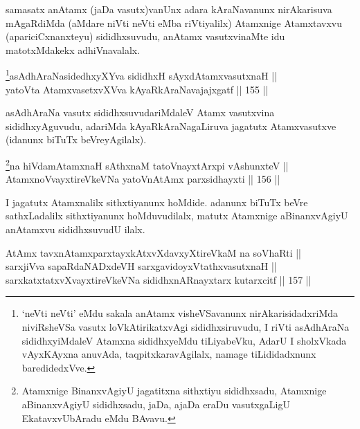 \begin{artha}
samasatx anAtamx (jaDa vasutx)vanUnx adara kAraNavanunx nirAkarisuva
mAgaRdiMda (aMdare niVti neVti eMba riVtiyalilx) Atamxnige Atamxtavxvu
(apariciCxnanxteyu) sididhxsuvudu, anAtamx vasutxvinaMte idu
matotxMdakekx adhiVnavalalx.
\end{artha}



\begin{shl}
\footnote{`neVti neVti' eMdu sakala anAtamx visheVSavanunx
nirAkarisidadxriMda niviRsheVSa vasutx loVkAtirikatxvAgi
sididhxsiruvudu, I riVti asAdhAraNa sididhxyiMdaleV Atamxna
sididhxyeMdu tiLiyabeVku, AdarU I sholxVkada vAyxKAyxna anuvAda,
taqpitxkaravAgilalx, namage tiLididadxnunx baredidedxVve.}asAdhAraNasidedhxyXYva sididhxH sAyxdAtamxvasutxnaH || \\
yatoV\s ta AtamxvasetxvXVva kAyaRkAraNavajajxgatf \hfill || 155 ||  
\end{shl}

\begin{artha}
asAdhAraNa vasutx sididhxsuvudariMdaleV Atamx vasutxvina
sididhxyAguvudu, adariMda kAyaRkAraNagaLiruva jagatutx Atamxvasutxve
(idanunx biTuTx beVreyAgilalx).
\end{artha}


\begin{shl}
\footnote{Atamxnige BinanxvAgiyU jagatitxna sithxtiyu sididhxsadu,
Atamxnige aBinanxvAgiyU sididhxsadu, jaDa, ajaDa eraDu vasutxgaLigU
EkatavxvUbAradu eMdu BAvavu.}na hiVdamAtamxnaH sAthxnaM tatoV\s nayxtArxpi vA\s shunxteV || \\
AtamxnoV\s vayxtireVkeVNa yatoV\s nAtAmx parxsidhayxti \hfill || 156 ||  
\end{shl}

\begin{artha}
I jagatutx Atamxnalilx sithxtiyanunx hoMdide. adanunx biTuTx beVre
sathxLadalilx sithxtiyanunx hoMduvudilalx, matutx Atamxnige
aBinanxvAgiyU anAtamxvu sididhxsuvudU ilalx.
\end{artha}


\begin{shl}
AtAmx tavxnAtamxparxtayxkAtxvXdavxyXtireVkaM na soV\s haRti || \\
sarxjiVva sapaRdaNADxdeVH sarxgavidoyxVtathxvasutxnaH || \\
sarxkatxtatxvXvayxtireVkeVNa sididhxnARnayxtarx kutarxcitf \hfill || 157 ||  
\end{shl}

